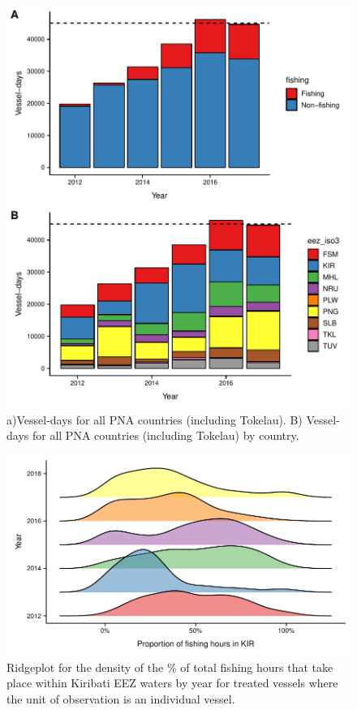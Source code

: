 \documentclass[9pttwoside,lineno]{pnas-new}
\begin{document}
\begin{figure}
\centering
	\includegraphics{img/all_PS_VDS_cty_year.pdf}
	\caption{\label{fig:VDS_year}a)Vessel-days for all PNA countries (including Tokelau).
	B) Vessel-days for all PNA countries (including Tokelau) by country.}
\end{figure}

\begin{figure}
\centering
	\includegraphics{img/hist_kir_fishing.pdf}
	\caption{\label{fig:hist_kir_fishing}Ridgeplot for the density of the \% of total fishing hours that take place
				within Kiribati EEZ waters by year for treated vessels where the unit of observation is an individual vessel.
}
\end{figure}
\end{document}
